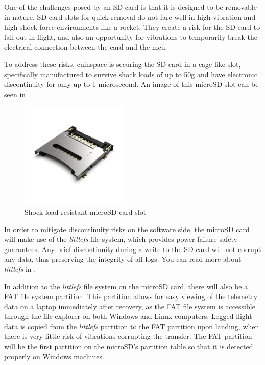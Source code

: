 One of the challenges posed by an SD card is that it is designed to be removable in nature. SD card slots for quick
removal do not fare well in high vibration and high shock force environments like a rocket. They create a risk for the
SD card to fall out in flight, and also an opportunity for vibrations to temporarily break the electrical connection
between the card and the \gls{mcu}.

To address these risks, \gls{cuinspace} is securing the SD card in a cage-like slot, specifically manufactured to
survive shock loads of up to 50g and have electronic discontinuity for only up to 1 microsecond.
\cite{sd-cage-datasheet} An image of this microSD slot can be seen in .

\begin{figure}[H]
    \centering
    \includegraphics[width=2in]{./assets/images/sd-card-cage.png}
    \caption{Shock load resistant microSD card slot \cite{sd-card-cage}}
    \label{fig:sd-card-cage}
\end{figure}

In order to mitigate discontinuity risks on the software side, the microSD card will make use of the \textit{littlefs}
file system, which provides power-failure safety guarantees. Any brief discontinuity during a write to the SD card will
not corrupt any data, thus preserving the integrity of all logs. You can read more about \textit{littlefs} in
.

In addition to the \textit{littlefs} file system on the microSD card, there will also be a FAT file system partition.
This partition allows for easy viewing of the telemetry data on a laptop immediately after recovery, as the FAT file
system is accessible through the file explorer on both Windows and Linux computers. Logged flight data is copied from
the \textit{littlefs} partition to the FAT partition upon landing, when there is very little risk of vibrations
corrupting the transfer. The FAT partition will be the first partition on the microSD's partition table so that it is
detected properly on Windows machines.

